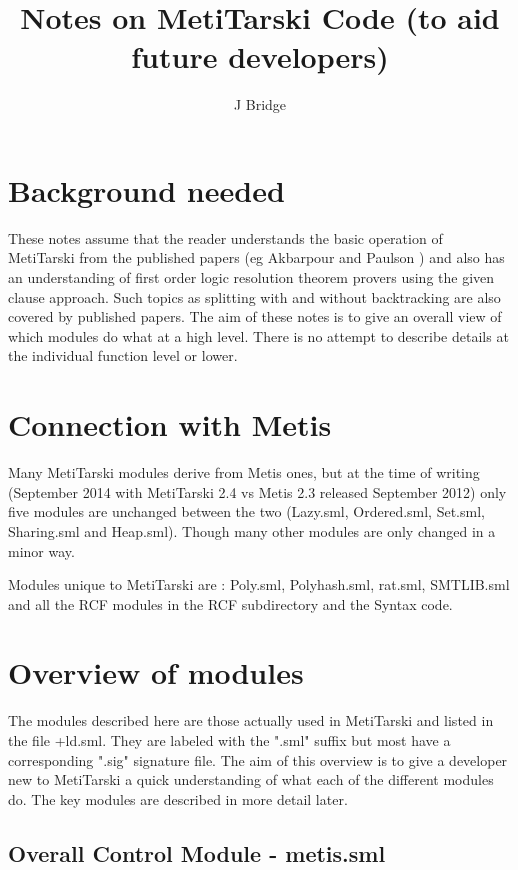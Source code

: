\documentclass[11pt, oneside]{article}   	%
\title{Notes on MetiTarski Code (to aid future developers)}
\author{J Bridge}
\begin{document}
\maketitle

\section{Background needed}
These notes assume that the reader understands the basic operation of MetiTarski from the published papers (eg Akbarpour and Paulson \cite{MT}) and also has an understanding of first order logic resolution theorem provers using the given clause approach. Such topics as splitting with and without backtracking are also covered by published papers\cite{SPASS_Splitting}\cite{MT_Splitting}. The aim of these notes is to give an overall view of which modules do what at a high level. There is no attempt to describe details at the individual function level or lower.



\section{Connection with Metis}

Many MetiTarski modules derive from Metis ones, but at the time of writing (September 2014 with MetiTarski 2.4 vs Metis 2.3 released September 2012) only five modules are unchanged between the two (Lazy.sml, Ordered.sml, Set.sml, Sharing.sml and Heap.sml). Though many other modules are only changed in a minor way.

Modules unique to MetiTarski are : Poly.sml, Polyhash.sml, rat.sml, SMTLIB.sml and all the RCF modules in the RCF subdirectory and the Syntax code.


\section{Overview of modules}

The modules described here are those actually used in MetiTarski and listed in the file +ld.sml. They are labeled with the ".sml" suffix but most have a corresponding ".sig" signature file.
The aim of this overview is to give a developer new to MetiTarski a quick understanding of what each of the different modules do. The key modules are described in more detail later.

\subsection{Overall Control Module - metis.sml}
\end{document}
